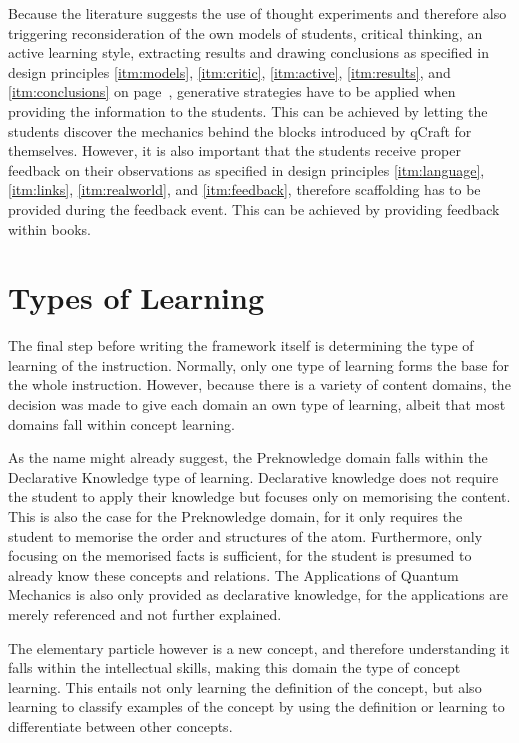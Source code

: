 \documentclass[11pt,twoside]{report} %
\begin{document}
Because the literature suggests the use of thought experiments and therefore also triggering reconsideration of the own models of students, critical thinking, an active learning style, extracting results and drawing conclusions as specified in design principles \ref{itm:models}, \ref{itm:critic}, \ref{itm:active}, \ref{itm:results}, and \ref{itm:conclusions} on page~\pageref{itm:models}, generative strategies have to be applied when providing the information to the students. This can be achieved by letting the students discover the mechanics behind the blocks introduced by qCraft for themselves. However, it is also important that the students receive proper feedback on their observations as specified in design principles \ref{itm:language}, \ref{itm:links}, \ref{itm:realworld}, and \ref{itm:feedback}, therefore scaffolding has to be provided during the feedback event. This can be achieved by providing feedback within books.

\section{Types of Learning}

The final step before writing the framework itself is determining the type of learning of the instruction. Normally, only one type of learning forms the base for the whole instruction. However, because there is a variety of content domains, the decision was made to give each domain an own type of learning, albeit that most domains fall within concept learning.

As the name might already suggest, the Preknowledge domain falls within the Declarative Knowledge type of learning. Declarative knowledge does not require the student to apply their knowledge but focuses only on memorising the content. This is also the case for the Preknowledge domain, for it only requires the student to memorise the order and structures of the atom. Furthermore, only focusing on the memorised facts is sufficient, for the student is presumed to already know these concepts and relations. The Applications of Quantum Mechanics is also only provided as declarative knowledge, for the applications are merely referenced and not further explained.

The elementary particle however is a new concept, and therefore understanding it falls within the intellectual skills, making this domain the type of concept learning. This entails not only learning the definition of the concept, but also learning to classify examples of the concept by using the definition or learning to differentiate between other concepts.
\end{document}
